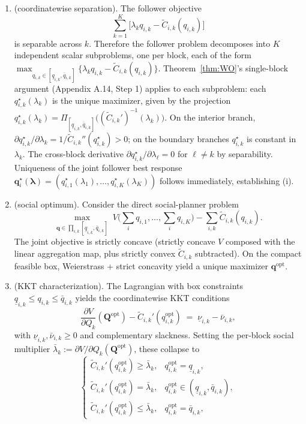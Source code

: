 \documentclass{article}
\begin{document}
\begin{enumerate}
    \item[Step 1] (coordinatewise separation). The follower objective
$$\sum_{k=1}^K \big[\lambda_k q_{i,k} - \widetilde C_{i,k}(q_{i,k})\big]$$
is separable across $k$. Therefore the follower problem decomposes into $K$ independent scalar subproblems, one per block, each of the form $\max_{q_{i,k} \in [\underline q_{i,k}, \bar q_{i,k}]} \{\lambda_k q_{i,k} - \widetilde C_{i,k}(q_{i,k})\}$. Theorem~\ref{thm:WO}'s single-block argument (Appendix A.14, Step 1) applies to each subproblem: each $q_{i,k}^\star(\lambda_k)$ is the unique maximizer, given by the projection $q_{i,k}^\star(\lambda_k) = \Pi_{[\underline q_{i,k}, \bar q_{i,k}]}\!\big((\widetilde C_{i,k}')^{-1}(\lambda_k)\big)$. On the interior branch, $\partial q_{i,k}^\star/\partial\lambda_k = 1/\widetilde C_{i,k}''(q_{i,k}^\star) > 0$; on the boundary branches $q_{i,k}^\star$ is constant in $\lambda_k$. The cross-block derivative $\partial q_{i,k}^\star/\partial\lambda_\ell = 0$ for $\ell \ne k$ by separability. Uniqueness of the joint follower best response $\mathbf q_i^\star(\boldsymbol\lambda) = (q_{i,1}^\star(\lambda_1), \ldots, q_{i,K}^\star(\lambda_K))$ follows immediately, establishing (i).
    \item[Step 2] (social optimum). Consider the direct social-planner problem
$$\max_{\mathbf q \in \prod_{i,k} [\underline q_{i,k}, \bar q_{i,k}]} \; V\!\Big(\textstyle\sum_i q_{i,1}, \ldots, \sum_i q_{i,K}\Big) - \sum_{i,k} \widetilde C_{i,k}(q_{i,k}).$$
The joint objective is strictly concave (strictly concave $V$ composed with the linear aggregation map, plus strictly convex $\widetilde C_{i,k}$ subtracted). On the compact feasible box, Weierstrass + strict concavity yield a unique maximizer $\mathbf q^{\mathrm{opt}}$.
    \item[Step 3] (KKT characterization). The Lagrangian with box constraints $\underline q_{i,k} \le q_{i,k} \le \bar q_{i,k}$ yields the coordinatewise KKT conditions
$$\frac{\partial V}{\partial Q_k}(\mathbf Q^{\mathrm{opt}}) - \widetilde C_{i,k}'(q_{i,k}^{\mathrm{opt}}) \;=\; \underline\nu_{i,k} - \bar\nu_{i,k},$$
with $\underline\nu_{i,k}, \bar\nu_{i,k} \ge 0$ and complementary slackness. Setting the per-block social multiplier $\bar\lambda_k := \partial V/\partial Q_k(\mathbf Q^{\mathrm{opt}})$, these collapse to
$$\begin{cases} \widetilde C_{i,k}'(q_{i,k}^{\mathrm{opt}}) \ge \bar\lambda_k, & q_{i,k}^{\mathrm{opt}} = \underline q_{i,k}, \\ \widetilde C_{i,k}'(q_{i,k}^{\mathrm{opt}}) = \bar\lambda_k, & q_{i,k}^{\mathrm{opt}} \in (\underline q_{i,k}, \bar q_{i,k}), \\ \widetilde C_{i,k}'(q_{i,k}^{\mathrm{opt}}) \le \bar\lambda_k, & q_{i,k}^{\mathrm{opt}} = \bar q_{i,k}, \end{cases}$$

\end{enumerate}
\end{document}
